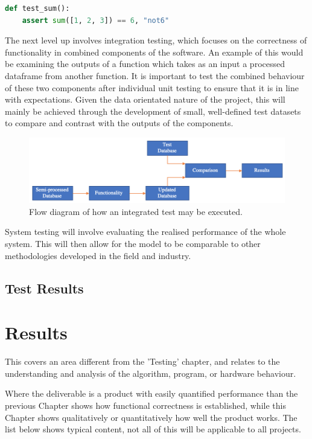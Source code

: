 \documentclass[10pt,onecolumn,letterpaper]{article}
\begin{document}
\begin{lstlisting}[language=Python]
def test_sum():
    assert sum([1, 2, 3]) == 6, "not6"
\end{lstlisting} 

The next level up involves integration testing, which focuses on the correctness of functionality in combined components of the software. An example of this would be examining the outputs of a function which takes as an input a processed dataframe from another function. It is important to test the combined behaviour of these two components after individual unit testing to ensure that it is in line with expectations. Given the data orientated nature of the project, this will mainly be achieved through the development of small, well-defined test datasets to compare and contrast with the outputs of the components.  

\begin{figure}[!hbt!]
\centering
\includegraphics[width=15.5cm]{integrated_testing.png}
\caption{Flow diagram of how an integrated test may be executed.}
\end{figure}

System testing will involve evaluating the realised performance of the whole system. This will then allow for the model to be comparable to other methodologies developed in the field and industry.

\subsection{Test Results} 


\newpage

\section{Results}

\iffalse
This covers an area different from the 'Testing' chapter, and relates to the understanding and analysis of the algorithm, program, or hardware behaviour.

Where the deliverable is a product with easily quantified performance than the previous Chapter shows how functional correctness is established, while this Chapter shows qualitatively or quantitatively how well the product works. The list below shows typical content, not all of this will be applicable to all projects.
\end{document}
